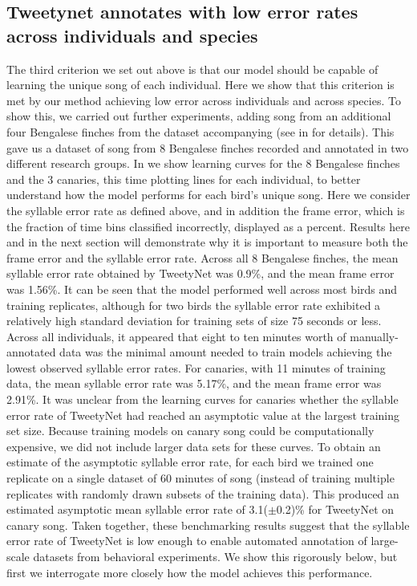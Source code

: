 \documentclass[9pt,lineno]{elife}
\begin{document}
\subsection{Tweetynet annotates with low error rates across individuals and species}
\label{results:across-indidviduals-species}
The third criterion we set out above is that our model should be 
capable of learning the unique song of each individual. 
Here we show that this criterion is met 
by our method achieving low error across individuals and across species.
To show this, we carried out further experiments, 
adding song from an additional four Bengalese finches from the dataset accompanying \cite{koumura_birdsongrecognition_2016}
(see  in  for details).
This gave us a dataset of song from 8 Bengalese finches recorded and annotated in two different research groups.
In  we show learning curves for the 8 Bengalese finches 
and the 3 canaries, this time plotting lines for each individual, 
to better understand how the model performs for each bird's unique song. 
Here we consider the syllable error rate as defined above, 
and in addition the frame error, which is the 
fraction of time bins classified incorrectly, displayed as a percent.
Results here and in the next section will demonstrate why it is important to measure 
both the frame error and the syllable error rate.
Across all 8 Bengalese finches, the mean syllable error rate 
obtained by TweetyNet was 0.9\%, and the mean frame error was 1.56\%. 
It can be seen that the model performed well across most birds and training replicates,  
although for two birds the syllable error rate exhibited a relatively high standard deviation 
for training sets of size 75 seconds or less.
Across all individuals, it appeared that eight to ten minutes worth of manually-annotated data was 
the minimal amount needed to train models achieving the lowest observed syllable error rates.
For canaries, with 11 minutes of training data, the mean syllable error rate was 5.17\%, 
and the mean frame error was 2.91\%.  
It was unclear from the learning curves for canaries whether  
the syllable error rate of TweetyNet had reached an asymptotic value 
at the largest training set size. 
Because training models on canary song could be computationally expensive, 
we did not include larger data sets for these curves. 
To obtain an estimate of the asymptotic syllable error rate, 
for each bird we trained one replicate on a single dataset of 60 minutes of song 
(instead of training multiple replicates with randomly drawn subsets of the training data). 
This produced an estimated asymptotic mean syllable error rate of 3.1($\pm$0.2)\% 
for TweetyNet on canary song.
Taken together, these benchmarking results suggest that 
the syllable error rate of TweetyNet is low enough 
to enable automated annotation of large-scale datasets from behavioral experiments.
We show this rigorously below, 
but first we interrogate more closely how the model achieves this performance.
\end{document}
